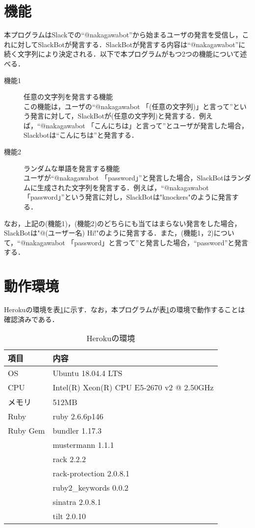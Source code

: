 \documentclass[12pt]{jsarticle}
\begin{document}
\section{機能}\label{sec:function}
本プログラムはSlackでの``@nakagawabot''から始まるユーザの発言を受信し，これに対してSlackBotが発言する．SlackBotが発言する内容は``@nakagawabot''に続く文字列により決定される．以下で本プログラムがもつ2つの機能について述べる．
\begin{description}
\item[機能1] 任意の文字列を発言する機能\\
  この機能は，ユーザの``@nakagawabot 「(任意の文字列)」と言って''という発言に対して，SlackBotが(任意の文字列)と発言する．例えば，``@nakagawabot 「こんにちは」と言って''とユーザが発言した場合，Slackbotは``こんにちは''と発言する．\label{func1}
\item[機能2] ランダムな単語を発言する機能\\
  ユーザが``@nakagawabot 「password」''と発言した場合，SlackBotはランダムに生成された文字列を発言する．例えば，``@nakagawabot 「password」''という発言に対し，SlackBotは"knockers"のように発言する．
\end{description}
なお，上記の(機能1)，(機能2)のどちらにも当てはまらない発言をした場合，SlackBotは"@(ユーザー名) Hi!"のように発言する．また，(機能1，2)について，``@nakagawabot 「password」と言って''と発言した場合，``password''と発言する．

\section{動作環境}\label{sec:env}
Herokuの環境を表\ref{tab:1}に示す．なお，本プログラムが表\ref{tab:1}の環境で動作することは確認済みである．
\begin{table}[h]
  \begin{center}
    \caption{Herokuの環境}\label{tab:1}
    \begin{tabular}{l|l}
      \hline\hline
      \multicolumn{1}{l|}{項目} & \multicolumn{1}{l}{内容}\\
      \hline
      OS & Ubuntu 18.04.4 LTS\\
      CPU & Intel(R) Xeon(R) CPU E5-2670 v2 @ 2.50GHz\\
      メモリ & 512MB\\
      Ruby & ruby 2.6.6p146\\
      Ruby Gem & bundler 1.17.3\\
      & mustermann 1.1.1\\
      & rack 2.2.2\\
      & rack-protection 2.0.8.1\\
      & ruby2\_keywords 0.0.2\\
      & sinatra 2.0.8.1\\
      & tilt 2.0.10\\
      \hline
    \end{tabular}
  \end{center}
\end{table}
\end{document}
